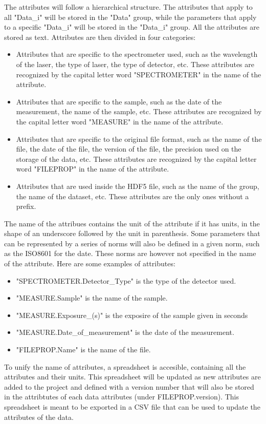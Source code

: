 The attributes will follow a hierarchical structure. The attributes that apply to all "Data\_i" will be stored in the "Data" group, while the parameters that apply to a specific "Data\_i" will be stored in the "Data\_i" group. All the attributes are stored as text. Attributes are then divided in four categories:
\begin{itemize}
    \item Attributes that are specific to the spectrometer used, such as the wavelength of the laser, the type of laser, the type of detector, etc. These attributes are recognized by the capital letter word "SPECTROMETER" in the name of the attribute.
    \item Attributes that are specific to the sample, such as the date of the measurement, the name of the sample, etc. These attributes are recognized by the capital letter word "MEASURE" in the name of the attribute.
    \item Attributes that are specific to the original file format, such as the name of the file, the date of the file, the version of the file, the precision used on the storage of the data, etc. These attributes are recognized by the capital letter word "FILEPROP" in the name of the attribute.
    \item Attributes that are used inside the HDF5 file, such as the name of the group, the name of the dataset, etc. These attributes are the only ones without a prefix.
\end{itemize}

The name of the attribues contains the unit of the attribute if it has units, in the shape of an underscore followed by the unit in parenthesis. Some parameters that can be represented by a series of norms will also be defined in a given norm, such as the ISO8601 for the date. These norms are however not specified in the name of the attribute. Here are some examples of attributes:
\begin{itemize}
    \item "SPECTROMETER.Detector\_Type" is the type of the detector used.
    \item "MEASURE.Sample" is the name of the sample.
    \item "MEASURE.Exposure\_(s)" is the exposire of the sample given in seconds
    \item "MEASURE.Date\_of\_measurement" is the date of the measurement. 
    \item "FILEPROP.Name" is the name of the file.
\end{itemize}

To unify the name of attributes, a spreadsheet is accesible, containing all the attributes and their units. This spreadsheet will be updated as new attributes are added to the project and defined with a version number that will also be stored in the attribtutes of each data attributes (under FILEPROP.version). This spreadsheet is meant to be exported in a CSV file that can be used to update the attributes of the data.